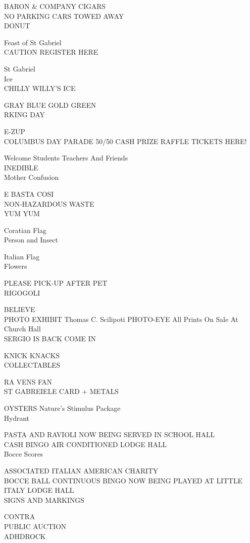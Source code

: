 \documentclass[10pt,letterpaper]{article}
\begin{document}
BARON \& COMPANY CIGARS\\
NO PARKING CARS TOWED AWAY\\
DONUT

Feast of St Gabriel\\
CAUTION REGISTER HERE

St Gabriel\\
Ice\\
CHILLY WILLY'S ICE

GRAY BLUE GOLD GREEN\\
RKING DAY

E{-}ZUP\\
COLUMBUS DAY PARADE 50/50 CASH PRIZE RAFFLE TICKETS HERE!

Welcome Students Teachers And Friends\\
INEDIBLE\\
Mother Confusion

E BASTA COSI\\
NON{-}HAZARDOUS WASTE\\
YUM YUM

Coratian Flag\\
Person and Insect

Italian Flag\\
Flowers

PLEASE PICK{-}UP AFTER PET\\
RIGOGOLI

BELIEVE\\
PHOTO EXHIBIT Thomas C. Scilipoti PHOTO{-}EYE All Prints On Sale At Church Hall\\
SERGIO IS BACK COME IN

KNICK KNACKS\\
COLLECTABLES

RA VENS FAN\\
ST GABREIELE CARD + METALS

OYSTERS Nature's Stimulus Package\\
Hydrant

PASTA AND RAVIOLI NOW BEING SERVED IN SCHOOL HALL\\
CASH BINGO AIR CONDITIONED LODGE HALL\\
Bocce Scores

ASSOCIATED ITALIAN AMERICAN CHARITY\\
BOCCE BALL CONTINUOUS BINGO NOW BEING PLAYED AT LITTLE ITALY LODGE HALL\\
SIGNS AND MARKINGS

CONTRA\\
PUBLIC AUCTION\\
ADHDROCK
\end{document}
